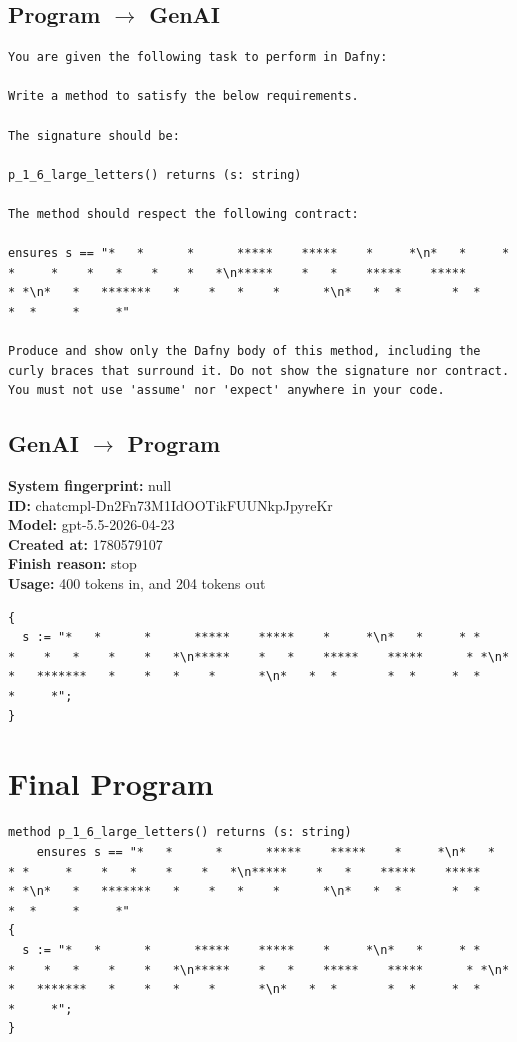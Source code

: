 \documentclass{article}
\begin{document}
\subsection*{Program $\rightarrow$ GenAI}
\begin{lstlisting}
You are given the following task to perform in Dafny:

Write a method to satisfy the below requirements.

The signature should be:

p_1_6_large_letters() returns (s: string)

The method should respect the following contract:

ensures s == "*   *      *      *****    *****    *     *\n*   *     * *     *    *   *    *    *   *\n*****    *   *    *****    *****      * *\n*   *   *******   *    *   *    *      *\n*   *  *       *  *     *  *     *     *"

Produce and show only the Dafny body of this method, including the curly braces that surround it. Do not show the signature nor contract. You must not use 'assume' nor 'expect' anywhere in your code.
\end{lstlisting}
\subsection*{GenAI $\rightarrow$ Program}
\textbf{System fingerprint: }null
\\\textbf{ID: }chatcmpl-Dn2Fn73M1IdOOTikFUUNkpJpyreKr
\\\textbf{Model: }gpt-5.5-2026-04-23
\\\textbf{Created at: }1780579107
\\\textbf{Finish reason: }stop
\\\textbf{Usage: }400 tokens in, and 204 tokens out
\begin{lstlisting}
{
  s := "*   *      *      *****    *****    *     *\n*   *     * *     *    *   *    *    *   *\n*****    *   *    *****    *****      * *\n*   *   *******   *    *   *    *      *\n*   *  *       *  *     *  *     *     *";
}
\end{lstlisting}
\section*{Final Program}
\begin{lstlisting}
method p_1_6_large_letters() returns (s: string)
	ensures s == "*   *      *      *****    *****    *     *\n*   *     * *     *    *   *    *    *   *\n*****    *   *    *****    *****      * *\n*   *   *******   *    *   *    *      *\n*   *  *       *  *     *  *     *     *"
{
  s := "*   *      *      *****    *****    *     *\n*   *     * *     *    *   *    *    *   *\n*****    *   *    *****    *****      * *\n*   *   *******   *    *   *    *      *\n*   *  *       *  *     *  *     *     *";
}
\end{lstlisting}
\end{document}

